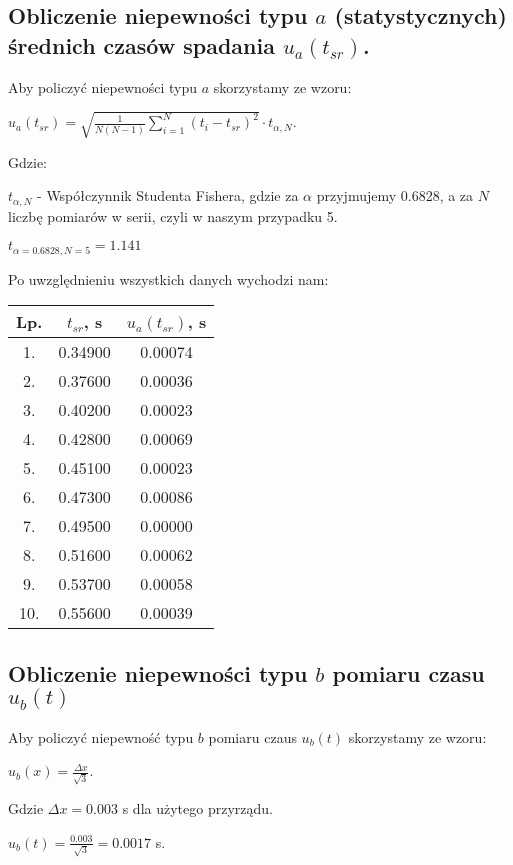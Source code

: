 \documentclass[12pt]{article}
\begin{document}
\subsection*{Obliczenie niepewności typu $a$ (statystycznych) średnich czasów
    spadania $u_a(t_{sr})$.} Aby policzyć niepewności typu $a$ skorzystamy ze
wzoru:
\begin{center}
    $u_a(t_{sr}) = \sqrt{\frac{1}{N(N-1)} \displaystyle\sum_{i=1}^{N} (t_i -
            t_{sr})^2} \cdot t_{\alpha, N}$.
\end{center}
Gdzie:
\begin{flushleft}
    $t_{\alpha, N}$ - Współczynnik Studenta Fishera, gdzie za $\alpha$
    przyjmujemy 0.6828, a za $N$ liczbę pomiarów w serii, czyli w naszym
    przypadku 5.
\end{flushleft}
\begin{center}
    $t_{\alpha=0.6828,N=5} = 1.141$
\end{center}
Po uwzględnieniu wszystkich danych wychodzi nam:
\begin{center}
    \begin{tabular} { | c | c | c | }
        \hline
        Lp. & $t_{sr}$, s & $u_a(t_{sr})$, s \\
        \hline
        1.  & 0.34900     & 0.00074          \\ \hline
        2.  & 0.37600     & 0.00036          \\ \hline
        3.  & 0.40200     & 0.00023          \\ \hline
        4.  & 0.42800     & 0.00069          \\ \hline
        5.  & 0.45100     & 0.00023          \\ \hline
        6.  & 0.47300     & 0.00086          \\ \hline
        7.  & 0.49500     & 0.00000          \\ \hline
        8.  & 0.51600     & 0.00062          \\ \hline
        9.  & 0.53700     & 0.00058          \\ \hline
        10. & 0.55600     & 0.00039          \\
        \hline
    \end{tabular}
\end{center}

\subsection*{Obliczenie niepewności typu $b$ pomiaru czasu $u_b(t)$}
Aby policzyć niepewność typu $b$ pomiaru czaus $u_b(t)$ skorzystamy ze wzoru:
\begin{center}
    $u_b(x) = \frac{\Delta x}{\sqrt{3}}$.
\end{center}
Gdzie $\Delta x = 0.003$ s dla użytego przyrządu.
\begin{center}
    $u_b(t) = \frac{0.003}{\sqrt{3}} = 0.0017$ s.
\end{center}
\end{document}
